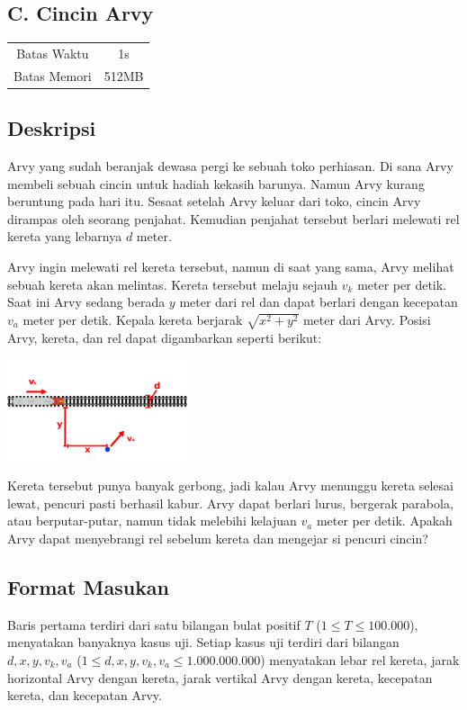 \documentclass{article}
\begin{document}
\begin{center}
    \section*{C. Cincin Arvy}

    \begin{tabular}{ | c c | }
        \hline
        Batas Waktu  & 1s \\
        Batas Memori & 512MB \\
        \hline
    \end{tabular}
\end{center}

\subsection*{Deskripsi}

Arvy yang sudah beranjak dewasa pergi ke sebuah toko perhiasan.
Di sana Arvy membeli sebuah cincin untuk hadiah kekasih barunya.
Namun Arvy kurang beruntung pada hari itu.
Sesaat setelah Arvy keluar dari toko, cincin Arvy dirampas oleh seorang penjahat.
Kemudian penjahat tersebut berlari melewati rel kereta yang lebarnya $d$ meter.

Arvy ingin melewati rel kereta tersebut, namun di saat yang sama, Arvy melihat sebuah kereta akan melintas.
Kereta tersebut melaju sejauh $v_k$ meter per detik.
Saat ini Arvy sedang berada $y$ meter dari rel dan dapat berlari dengan kecepatan $v_a$ meter per detik.
Kepala kereta berjarak $\sqrt{x^2+y^2}$ meter dari Arvy.
Posisi Arvy, kereta, dan rel dapat digambarkan seperti berikut:

\begin{center}
    \includegraphics[width=200px]{skema}
\end{center}

Kereta tersebut punya banyak gerbong, jadi kalau Arvy menunggu kereta selesai lewat, pencuri pasti berhasil kabur.
Arvy dapat berlari lurus, bergerak parabola, atau berputar-putar, namun tidak melebihi kelajuan $v_a$ meter per detik.
Apakah Arvy dapat menyebrangi rel sebelum kereta dan mengejar si pencuri cincin?

\subsection*{Format Masukan}
Baris pertama terdiri dari satu bilangan bulat positif $T$ ($1 \leq T \leq 100.000$), menyatakan banyaknya kasus uji.
Setiap kasus uji terdiri dari bilangan $d, x, y, v_k, v_a$ ($1 \leq d, x, y, v_k, v_a \leq 1.000.000.000$) menyatakan lebar rel kereta, jarak horizontal Arvy dengan kereta, jarak vertikal Arvy dengan kereta, kecepatan kereta, dan kecepatan Arvy.
\end{document}
